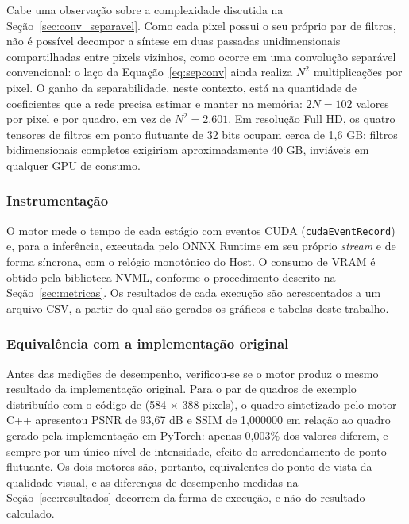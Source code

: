 \documentclass[
    12pt,                %
    openright,           %
    oneside,             %
    a4paper,             %
    english,             %
    brazil               %
]{abntex2}
\begin{document}
Cabe uma observação sobre a complexidade discutida na Seção~\ref{sec:conv_separavel}. Como cada pixel possui o seu próprio par de filtros, não é possível decompor a síntese em duas passadas unidimensionais compartilhadas entre pixels vizinhos, como ocorre em uma convolução separável convencional: o laço da Equação~\ref{eq:sepconv} ainda realiza $N^2$ multiplicações por pixel. O ganho da separabilidade, neste contexto, está na quantidade de coeficientes que a rede precisa estimar e manter na memória: $2N = 102$ valores por pixel e por quadro, em vez de $N^2 = 2.601$. Em resolução Full HD, os quatro tensores de filtros em ponto flutuante de 32 bits ocupam cerca de 1,6 GB; filtros bidimensionais completos exigiriam aproximadamente 40 GB, inviáveis em qualquer GPU de consumo.

\subsubsection{Instrumentação}
\label{sec:instrumentacao}

O motor mede o tempo de cada estágio com eventos CUDA (\texttt{cudaEventRecord}) e, para a inferência, executada pelo ONNX Runtime em seu próprio \textit{stream} e de forma síncrona, com o relógio monotônico do Host. O consumo de VRAM é obtido pela biblioteca NVML, conforme o procedimento descrito na Seção~\ref{sec:metricas}. Os resultados de cada execução são acrescentados a um arquivo CSV, a partir do qual são gerados os gráficos e tabelas deste trabalho.

\subsubsection{Equivalência com a implementação original}
\label{sec:equivalencia}

Antes das medições de desempenho, verificou-se se o motor produz o mesmo resultado da implementação original. Para o par de quadros de exemplo distribuído com o código de  (584 $\times$ 388 pixels), o quadro sintetizado pelo motor C++ apresentou PSNR de 93,67 dB e SSIM de 1,000000 em relação ao quadro gerado pela implementação em PyTorch: apenas 0,003\% dos valores diferem, e sempre por um único nível de intensidade, efeito do arredondamento de ponto flutuante. Os dois motores são, portanto, equivalentes do ponto de vista da qualidade visual, e as diferenças de desempenho medidas na Seção~\ref{sec:resultados} decorrem da forma de execução, e não do resultado calculado.
\end{document}
